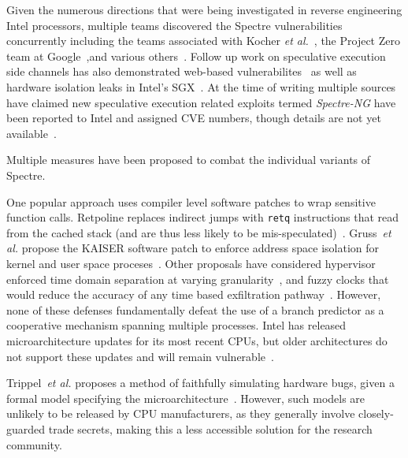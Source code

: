 Given the numerous directions that were being investigated in reverse engineering 
Intel processors, multiple teams discovered the Spectre vulnerabilities concurrently including 
the teams associated with Kocher \textit{et al.}~\cite{spectre}, the Project Zero team 
at Google~\cite{project_zero},and various others~\cite{evtyushkin2018branchscope,maisuradze2018speculose}. 
Follow 
up work on speculative execution side channels has also demonstrated
web-based vulnerabilites~\cite{genkin2018drive} as well as hardware isolation  
leaks in Intel's SGX~\cite{spectre_sgx}. At the time of writing multiple sources
have claimed new speculative execution related exploits termed \textit{Spectre-NG}
have been reported to Intel and assigned CVE numbers, though details are
not yet available~\cite{spectre_ng_gossip}.



Multiple measures have been proposed to combat the 
individual variants of Spectre.

One popular approach uses compiler level software patches to wrap sensitive 
function calls. Retpoline replaces indirect jumps with \texttt{retq}
instructions that read from the cached stack (and are thus less likely to be
mis-speculated)~\cite{retpoline}.
Gruss~\textit{et al.} propose the KAISER software patch to enforce address space
isolation for kernel and user space proceses~\cite{gruss2017kaslr}. 
Other proposals have considered hypervisor enforced time domain separation at varying 
granularity~\cite{renau2018securing}, and fuzzy clocks that would reduce the accuracy 
of any time based exfiltration pathway~\cite{hu1992reducing}. However, none of these defenses
fundamentally defeat the use of a branch predictor as a cooperative mechanism
spanning multiple processes. Intel has released microarchitecture updates for
its most recent CPUs, but older architectures do not support these updates and
will remain vulnerable~\cite{intel-micro-patch}.


Trippel~\textit{et al.} proposes a method of faithfully simulating hardware
bugs, given a formal model specifying the
microarchitecture~\cite{trippel2018meltdownprime}. However, such models are
unlikely to be released by CPU manufacturers, as they generally involve
closely-guarded trade secrets, making this a less accessible solution for the
research community.

%



